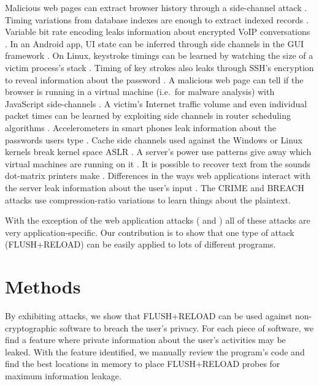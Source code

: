 \documentclass{acm_proc_article-sp}
\begin{document}
Malicious web pages can extract browser history through a side-channel attack
\cite{weinberg2011still}. Timing variations from database indexes are enough to
extract indexed records \cite{futoransky2007nd2db}. Variable bit rate encoding
leaks information about encrypted VoIP conversations
\cite{white2011phonotactic}. In an Android app, UI state can be inferred through
side channels in the GUI framework \cite{chen2014peeking}. On Linux, keystroke
timings can be learned by watching the size of a victim process's stack
\cite{zhang2009peeping}. Timing of key strokes also leaks through SSH's
encryption to reveal information about the password \cite{song2001timing}.
A malicious web page can tell if the browser is running in a virtual machine
(i.e.\ for malware analysis) with JavaScript side-channels \cite{ho2014tick}.
A victim's Internet traffic volume and even individual packet times can be
learned by exploiting side channels in router scheduling algorithms
\cite{kadloor2010low}. Accelerometers in smart phones leak information about the
passwords users type \cite{owusu2012accessory} \cite{cai2012practicality}. Cache
side channels used against the Windows or Linux kernels break kernel space ASLR
\cite{hund2013practical}. A server's power use patterns give away which virtual
machines are running on it \cite{hlavacs2011energy}. It is possible to recover
text from the sounds dot-matrix printers make \cite{backes2010acoustic}.
Differences in the ways web applications interact with the server leak
information about the user's input \cite{bortz2007exposing} \cite{chen2010side}.
The CRIME \cite{duong2012crime} and BREACH \cite{gluck2013breach} attacks use
compression-ratio variations to learn things about the plaintext.

With the exception of the web application attacks (\cite{bortz2007exposing} and
\cite{chen2014peeking}) all of these attacks are very application-specific. Our
contribution is to show that one type of attack (FLUSH+RELOAD) can be easily
applied to lots of different programs.

\section{Methods}
\label{sec:methods}


By exhibiting attacks, we show that FLUSH+RELOAD can be used against
non-cryptographic software to breach the user's privacy. For each piece of
software, we find a feature where private information about the user's
activities may be leaked. With the feature identified, we manually review the
program's code and find the best locations in memory to place FLUSH+RELOAD
probes for maximum information leakage.
\end{document}

